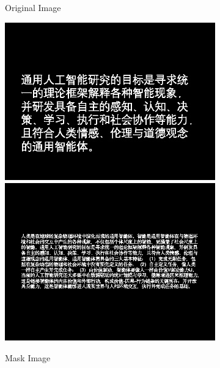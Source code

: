 \documentclass[11pt]{article}
\begin{document}
\begin{figure}[ht!]
\begin{subfigure}[]{0.333\linewidth}
        \caption{Original Image}
    \end{subfigure}%
    \hfill%
    \begin{subfigure}[]{0.333\linewidth}
        \centering
        \includegraphics[width=\linewidth]{fig/mask_big.jpg}
        \includegraphics[width=\linewidth]{fig/mask_small.jpg}
        \caption{Mask Image}
    \end{subfigure}%
    \hfill%
    \begin{subfigure}[]{0.333\linewidth}
        \centering

\end{subfigure}
\end{figure}
\end{document}
